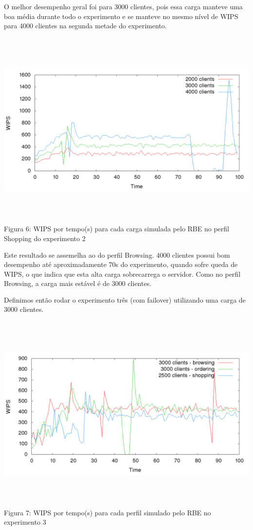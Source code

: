 \documentclass[11pt,twoside]{article}
\begin{document}
O melhor desempenho geral foi para 3000 clientes, pois essa carga manteve uma boa média durante todo o experimento e se manteve no mesmo nível de WIPS para 4000 clientes na segunda metade do experimento.

\begin{center}
\includegraphics[width=15cm, height=10cm]{images/exp2/plot_shopping}
Figura 6: WIPS por tempo(s) para cada carga simulada pelo RBE no perfil Shopping do experimento 2
\end{center}

Este resultado se assemelha ao do perfil Browsing. 4000 clientes possui bom desempenho até aproximadamente 70s do experimento, quando sofre queda de WIPS, o que indica que esta alta carga sobrecarrega o servidor. Como no perfil Browsing, a carga mais estável é de 3000 clientes.

Definimos então rodar o experimento três (com failover) utilizando uma carga de 3000 clientes.

\begin{center}
\includegraphics[width=15cm, height=10cm]{images/exp3/plot_exp3}
Figura 7: WIPS por tempo(s) para cada perfil simulado pelo RBE no experimento 3
\end{center}
\end{document}
